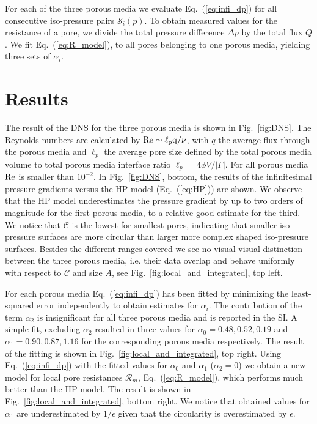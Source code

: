 \documentclass[draft]{agujournal2019}
\begin{document}
For each of the three porous media we evaluate Eq.~(\ref{eq:infi_dp}) for all consecutive iso-pressure pairs $\mathcal{S}_i(p)$. To obtain measured values for the resistance of a pore, we divide the total pressure difference $\Delta p$ by the total flux $Q$. We fit Eq.~(\ref{eq:R_model}), to all pores belonging to one porous media, yielding three sets of $\alpha_i$.  

\section{Results}


The result of the DNS for the three porous media is shown in Fig.~\ref{fig:DNS}. The Reynolds numbers are calculated by $\rm{Re} \sim \ell_p q/\nu$, with $q$ the average flux through the porous media and $\ell_p$ the average pore size defined by the total porous media volume to total porous media interface ratio $\ell_p = 4 \phi V/|\Gamma|$. For all porous media $\rm{Re}$ is smaller than $10^{-2}$. In Fig.~\ref{fig:DNS}, bottom, the results of the infinitesimal pressure gradients versus the HP model (Eq.~(\ref{eq:HP})) are shown. We observe that the HP model underestimates the pressure gradient by up to two orders of magnitude for the first porous media, to a relative good estimate for the third. We notice that $\mathcal{C}$ is the lowest for smallest pores, indicating that smaller iso-pressure surfaces are more circular than larger more complex shaped iso-pressure surfaces. Besides the different ranges covered we see no visual visual distinction between the three porous media, i.e. their data overlap and behave uniformly with respect to $\mathcal{C}$ and size $A$, see Fig.~\ref{fig:local_and_integrated}, top left.
 
For each porous media Eq.~(\ref{eq:infi_dp}) has been fitted by minimizing the least-squared error independently to obtain estimates for $\alpha_i$. The contribution of the term $\alpha_2$ is insignificant for all three porous media and is reported in the SI. A simple fit, excluding $\alpha_2$ resulted in three values for $\alpha_0 = 0.48, 0.52, 0.19$ and $\alpha_1 = 0.90, 0.87, 1.16$ for the corresponding porous media respectively. The result of the fitting is shown in Fig.~\ref{fig:local_and_integrated}, top right. Using Eq.~(\ref{eq:infi_dp}) with the fitted values for $\alpha_0$ and $\alpha_1$ ($\alpha_2 = 0$) we obtain a new model for local pore resistances $\mathcal{R}_m$, Eq.~(\ref{eq:R_model}), which performs much better than the HP model. The result is shown in Fig.~\ref{fig:local_and_integrated}, bottom right. We notice that obtained values for $\alpha_1$ are underestimated by $1/\epsilon$ given that the circularity is overestimated by $\epsilon$. 
\end{document}
